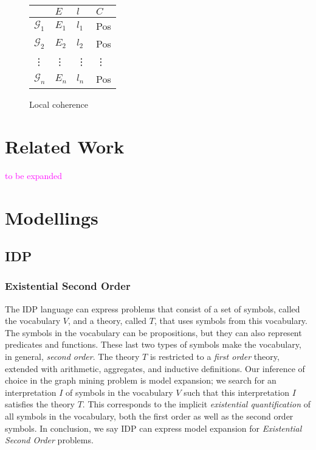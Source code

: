\documentclass{article}
\theoremstyle{definition}
\newcommand{\graph}[1]{\ensuremath{\mathcal{#1}}}
\newcommand{\sergey}[1]{\textcolor{magenta}{\marginpar{\sc Sergey} #1}}
\begin{document}




\begin{figure}[h]
\centering
\begin{tabular}{l |l l l}
         & $E$ & $l$      & $C$ \\
\hline
$\graph{G}_{1}$  & $E_{1}$ & $l_{1}$ & Pos\\
$\graph{G}_{2}$  & $E_{2}$ & $l_{2}$ & Pos\\
  \vdots & \vdots  & \vdots  & \vdots\\
$\graph{G}_{n}$  & $E_{n}$ & $l_{n}$ & Pos\\
\end{tabular}
\caption{Local coherence\label{Fig:LocalCoherence}}
\end{figure}





\section{Related Work}
\sergey{to be expanded}
\section{Modellings}
\subsection{IDP}
\subsubsection{Existential Second Order}
The IDP language can express problems that consist of a set of symbols, called the vocabulary $V$, and a theory, called $T$, that uses symbols from this vocabulary.
The symbols in the vocabulary can be propositions, but they can also represent predicates and functions.
These last two types of symbols make the vocabulary, in general, \emph{second order}.
The theory $T$ is restricted to a \emph{first order} theory, extended with arithmetic, aggregates, and inductive definitions.
Our inference of choice in the graph mining problem is model expansion; we search for an interpretation $I$ of symbols in the vocabulary $V$ such that this interpretation $I$ satisfies the theory $T$.
This corresponds to the implicit \emph{existential quantification} of all symbols in the vocabulary, both the first order as well as the second order symbols.
In conclusion, we say IDP can express model expansion for \emph{Existential Second Order} problems. 
\end{document}
